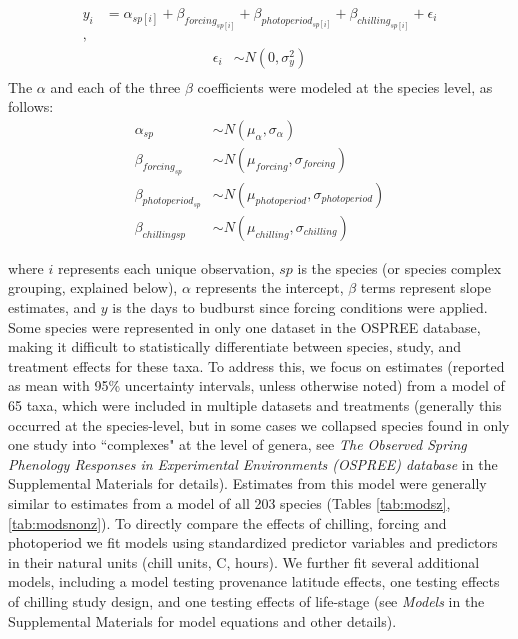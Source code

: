 \documentclass{article}
\begin{document}
\begin{align*}
y_i &= \alpha_{sp[i]} + \beta_{forcing_{sp[i]}} + \beta_{photoperiod_{sp[i]}} + \beta_{chilling_{sp[i]}} + \epsilon_i\\,
\end{align*}
\begin{align*}
\epsilon_i & \sim N(0,\sigma^2_y) \\
\end{align*}
\noindent The $\alpha$ and each of the three $\beta$ coefficients were modeled at the species level, as follows:
\begin{align*}
\alpha_{sp} & \sim N(\mu_{\alpha}, \sigma_{\alpha}) \\
\beta_{forcing_{sp}} & \sim N(\mu_{forcing}, \sigma_{forcing}) \\
\beta_{photoperiod_{sp}} & \sim N(\mu_{photoperiod}, \sigma_{photoperiod})\\
\beta_{chilling{sp}} & \sim N(\mu_{chilling}, \sigma_{chilling})
\end{align*}

where $i$ represents each unique observation, $sp$ is the species (or species complex grouping, explained below), $\alpha$ represents the intercept, $\beta$ terms represent slope estimates, and $y$ is the days to budburst since forcing conditions were applied. Some species were represented in only one dataset in the OSPREE database, making it difficult to statistically differentiate between species, study, and treatment effects for these taxa. To address this, we focus on estimates (reported as mean with 95\% uncertainty intervals, unless otherwise noted) from a model of 65 taxa, which were included in multiple datasets and treatments (generally this occurred at the species-level, but in some cases we collapsed species found in only one study into ``complexes" at the level of genera, see \emph{The Observed Spring Phenology Responses in Experimental Environments (OSPREE) database} in the Supplemental Materials for details). Estimates from this model were generally similar to estimates from a model of all 203 species (Tables \ref{tab:modsz}, \ref{tab:modsnonz}). To directly compare the effects of chilling, forcing and photoperiod we fit models using standardized predictor variables \emph{\citep[{\normalfont following}][{\normalfont which we refer to as ``standard units''}]{gelman2006}} and predictors in their natural units (chill units, \degree C, hours). We further fit several additional models, including a model testing provenance latitude effects, one testing effects of chilling study design, and one testing effects of life-stage (see \emph{Models} in the Supplemental Materials for model equations and other details). 
\end{document}
